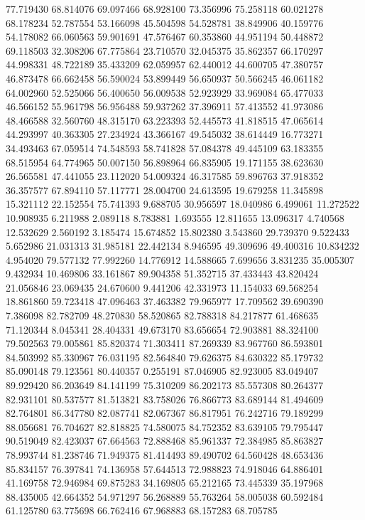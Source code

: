 77.719430
68.814076
69.097466
68.928100
73.356996
75.258118
60.021278
68.178234
52.787554
53.166098
45.504598
54.528781
38.849906
40.159776
54.178082
66.060563
59.901691
47.576467
60.353860
44.951194
50.448872
69.118503
32.308206
67.775864
23.710570
32.045375
35.862357
66.170297
44.998331
48.722189
35.433209
62.059957
62.440012
44.600705
47.380757
46.873478
66.662458
56.590024
53.899449
56.650937
50.566245
46.061182
64.002960
52.525066
56.400650
56.009538
52.923929
33.969084
65.477033
46.566152
55.961798
56.956488
59.937262
37.396911
57.413552
41.973086
48.466588
32.560760
48.315170
63.223393
52.445573
41.818515
47.065614
44.293997
40.363305
27.234924
43.366167
49.545032
38.614449
16.773271
34.493463
67.059514
74.548593
58.741828
57.084378
49.445109
63.183355
68.515954
64.774965
50.007150
56.898964
66.835905
19.171155
38.623630
26.565581
47.441055
23.112020
54.009324
46.317585
59.896763
37.918352
36.357577
67.894110
57.117771
28.004700
24.613595
19.679258
11.345898
15.321112
22.152554
75.741393
9.688705
30.956597
18.040986
6.499061
11.272522
10.908935
6.211988
2.089118
8.783881
1.693555
12.811655
13.096317
4.740568
12.532629
2.560192
3.185474
15.674852
15.802380
3.543860
29.739370
9.522433
5.652986
21.031313
31.985181
22.442134
8.946595
49.309696
49.400316
10.834232
4.954020
79.577132
77.992260
14.776912
14.588665
7.699656
3.831235
35.005307
9.432934
10.469806
33.161867
89.904358
51.352715
37.433443
43.820424
21.056846
23.069435
24.670600
9.441206
42.331973
11.154033
69.568254
18.861860
59.723418
47.096463
37.463382
79.965977
17.709562
39.690390
7.386098
82.782709
48.270830
58.520865
82.788318
84.217877
61.468635
71.120344
8.045341
28.404331
49.673170
83.656654
72.903881
88.324100
79.502563
79.005861
85.820374
71.303411
87.269339
83.967760
86.593801
84.503992
85.330967
76.031195
82.564840
79.626375
84.630322
85.179732
85.090148
79.123561
80.440357
0.255191
87.046905
82.923005
83.049407
89.929420
86.203649
84.141199
75.310209
86.202173
85.557308
80.264377
82.931101
80.537577
81.513821
83.758026
76.866773
83.689144
81.494609
82.764801
86.347780
82.087741
82.067367
86.817951
76.242716
79.189299
88.056681
76.704627
82.818825
74.580075
84.752352
83.639105
79.795447
90.519049
82.423037
67.664563
72.888468
85.961337
72.384985
85.863827
78.993744
81.238746
71.949375
81.414493
89.490702
64.560428
48.653436
85.834157
76.397841
74.136958
57.644513
72.988823
74.918046
64.886401
41.169758
72.946984
69.875283
34.169805
65.212165
73.445339
35.197968
88.435005
42.664352
54.971297
56.268889
55.763264
58.005038
60.592484
61.125780
63.775698
66.762416
67.968883
68.157283
68.705785
